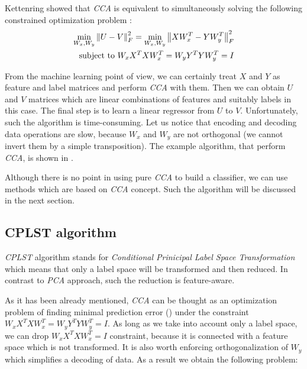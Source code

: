 Kettenring showed that \textit{CCA} is equivalent to simultaneously solving the following constrained optimization problem \cite{ChenLin}:
\begin{equation}\label{eq:cca3}
\begin{split}
    \min_{W_x, W_y} \left\lVert U-V\right\rVert_{F}^2 = \min_{W_x, W_y} \left\lVert XW_x^T-YW_y^T\right\rVert_{F}^2 \\ 
    \text{   subject to   } W_xX^TXW_x^T=W_yY^TYW_y^T=I   
\end{split}
\end{equation}

From the machine learning point of view, we can certainly treat $X$ and $Y$ as feature and label matrices and perform \textit{CCA} with them. Then we can obtain $U$ and $V$ matrices which are linear combinations of features and suitably labels in this case. The final step is to learn a linear regressor from $U$ to $V$. Unfortunately, such the algorithm is time-consuming. Let us notice that encoding and decoding data operations are slow, because $W_x$ and $W_y$ are not orthogonal (we cannot invert them by a simple transposition). The example algorithm, that perform \textit{CCA}, is shown in . 

Although there is no point in using pure \textit{CCA} to build a classifier, we can use methods which are based on \textit{CCA} concept. Such the algorithm will be discussed in the next section.

\subsection{CPLST algorithm}

\textit{CPLST} algorithm stands for \textit{Conditional Prinicipal Label Space Transformation} which means that only a label space will be transformed and then reduced. In contrast to \textit{PCA} approach, such the reduction is feature-aware. 

As it has been already mentioned, \textit{CCA} can be thought as an optimization problem of finding minimal prediction error () under the constraint $W_xX^TXW_x^T=W_yY^TYW_y^T=I$. As long as we take into account only a label space, we can drop $W_xX^TXW_x^T=I$ constraint, because it is connected with a feature space which is not transformed. It is also worth enforcing orthogonalization of $W_y$  which simplifies a decoding of data. As a result we obtain the following problem:


